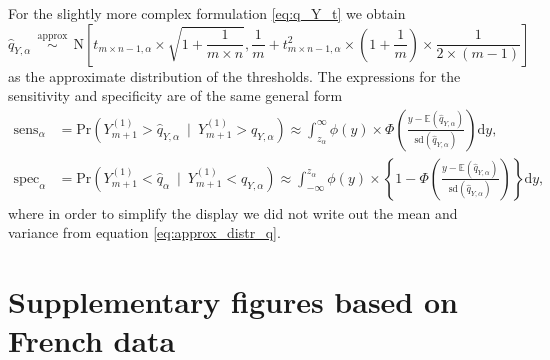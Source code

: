 \documentclass[12pt]{article}
\begin{document}
For the slightly more complex formulation \eqref{eq:q_Y_t} we obtain
\begin{equation}
\hat{q}_{Y, \alpha} \ \  \stackrel{\text{approx}}{\sim} \ \ \text{N}\left[t_{m \times n - 1, \alpha} \times \sqrt{1 + \frac{1}{m \times n}}, \frac{1}{m} + t_{m \times n - 1, \alpha}^2 \times \left(1 + \frac{1}{m} \right) \times \frac{1}{2 \times (m - 1)} \right] \label{eq:approx_distr_q}
\end{equation}
as the approximate distribution of the thresholds. The expressions for the sensitivity and specificity are of the same general form
\begin{align}
\text{sens}_\alpha & = \text{Pr}\left(Y_{m + 1}^{(1)} > \hat{q}_{Y, \alpha} \ \mid \ Y_{m + 1}^{(1)} > q_{Y, \alpha}\right) \approx \int_{z_\alpha}^\infty \phi(y) \times \Phi\left(\frac{y - \mathbb{E}(\hat{q}_{Y, \alpha})}{\text{sd}(\hat{q}_{Y, \alpha})}\right) \text{d}y,
\label{eq:sens_t}\\
\text{spec}_\alpha & = \text{Pr}\left(Y_{m + 1}^{(1)} < \hat{q}_\alpha \ \mid \ Y_{m + 1}^{(1)} < q_{Y, \alpha}\right) \approx \int_{-\infty}^{z_\alpha}\phi(y) \times \left\{1 - \Phi\left(\frac{y - \mathbb{E}(\hat{q}_{Y, \alpha})}{\text{sd}(\hat{q}_{Y, \alpha})}\right)\right\} \text{d}y,
\end{align}
where in order to simplify the display we did not write out the mean and variance from equation \eqref{eq:approx_distr_q}.



\newpage

\section{Supplementary figures based on French data}
\end{document}
